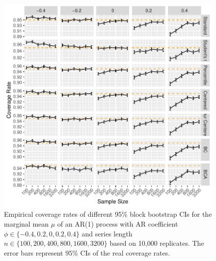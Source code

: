 \documentclass[12pt, letterpaper, titlepage]{article}
\begin{document}
\begin{figure}[tbp]
  \centering
  \includegraphics[width=\textwidth]{figures/plot_mu}
  \caption{Empirical coverage rates of different 95\% block bootstrap CIs for
    the marginal mean $\mu$ of an AR(1) process with AR coefficient
    $\phi \in \{-0.4, 0.2, 0, 0.2, 0.4\}$ and series length
    $n \in \{100, 200, 400, 800, 1600, 3200\}$ based on 10,000 replicates.
    The error bars represent 95\% CIs of the real coverage rates.}
  \label{fig:mu}
\end{figure}
\end{document}

